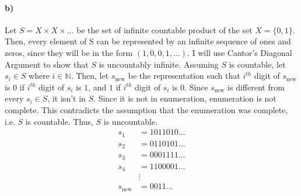 \documentclass[12pt]{article}
\newcommand\+{\mkern2mu}
\begin{document}
\paragraph{b)}
Let $S = X \times X \times \dotso$ be the set of infinite countable product of the set $X = \{0, 1\}$.
Then, every element of S can be represented by an infinite sequence of ones and zeros, since they will be in the form $(1, 0, 0, 1, \dotso)$.
I will use Cantor's Diagonal Argument to show that $S$ is uncountably infinite.
Assuming $S$ is countable, let $s_i \in S$ where $i \in \mathbb{N}$.
Then, let $s_\text{new}$ be the representation such that $i^{th}$ digit of $s_\text{new}$ is $0$ if $i^{th}$ digit of $s_i$ is $1$, and $1$ if $i^{th}$ digit of $s_i$ is $0$.
Since $s_\text{new}$ is different from every $s_i \in S$, it isn't in $S$.
Since it is not in enumeration, enumeration is not complete.
This contradicts the assumption that the enumeration was complete, i.e. $S$ is countable.
Thus, $S$ is uncountable.
\begin{align*}
s_1 &= 1011010\dotso \\
s_2 &= 0110101\dotso \\
s_3 &= 0001111\dotso \\
s_4 &= 1100001\dotso \\
& \vdots \\
s_\text{new} &= 0011\dotso
\end{align*}
\end{document}
